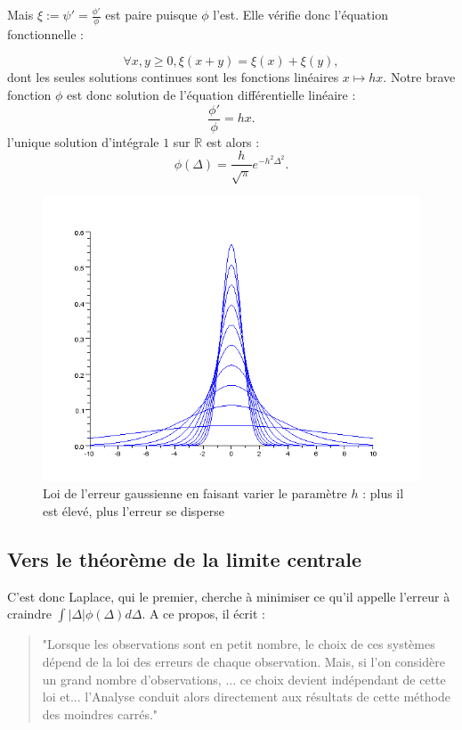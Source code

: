 \documentclass{article}
\newcommand{\R}{\mathbb R}
\begin{document}
Mais $\xi:= \psi'=\frac{\phi'}{\phi}$ est paire puisque $\phi$ l'est. Elle vérifie donc l'équation fonctionnelle :

\[\forall x,y\geq 0,  \xi(x+y)=\xi(x)+\xi(y),\]
dont les seules solutions continues  sont les fonctions linéaires $x\mapsto hx$. Notre brave fonction $\phi$ est donc solution de l'équation différentielle linéaire :
\[\frac{\phi'}{\phi}=hx.\]
l'unique solution d'intégrale $1$ sur $\R$ est alors :
\[\phi(\Delta)= \frac{h}{\sqrt \pi} e^{-h^2\Delta^2}.\]

\begin{figure}[!h]\centering
\includegraphics[scale=0.4]{Gaussienne.png}
\caption{Loi de l'erreur gaussienne en faisant varier le paramètre $h$ : plus il est élevé, plus l'erreur se disperse}
\label{fig:Gaussienne}
\end{figure}

\subsection{Vers le théorème de la limite centrale}

C'est donc Laplace, qui le premier, cherche à minimiser ce qu'il appelle l'erreur à craindre $\int |\Delta|\phi(\Delta)d\Delta$. A ce propos, il écrit :
\begin{quotation}
"Lorsque les observations sont en petit nombre, le choix de ces systèmes dépend de la loi des erreurs de chaque observation. Mais, si l'on considère un grand nombre d'observations, ... ce choix devient indépendant de cette loi et... l'Analyse conduit alors directement aux résultats de cette méthode des moindres carrés."
\end{quotation}
\end{document}
